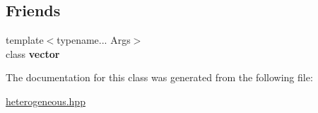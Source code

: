 \subsection*{Friends}
\begin{DoxyCompactItemize}
\item 
\hypertarget{classheterogeneous_1_1vector_3_01_t_00_01_types_8_8_8_4_a8b6d5131518076b9287ee5a8d57a05ff}{}{\footnotesize template$<$typename... Args$>$ }\\class {\bfseries vector}\label{classheterogeneous_1_1vector_3_01_t_00_01_types_8_8_8_4_a8b6d5131518076b9287ee5a8d57a05ff}

\end{DoxyCompactItemize}


The documentation for this class was generated from the following file\+:\begin{DoxyCompactItemize}
\item 
\hyperlink{heterogeneous_8hpp}{heterogeneous.\+hpp}\end{DoxyCompactItemize}
